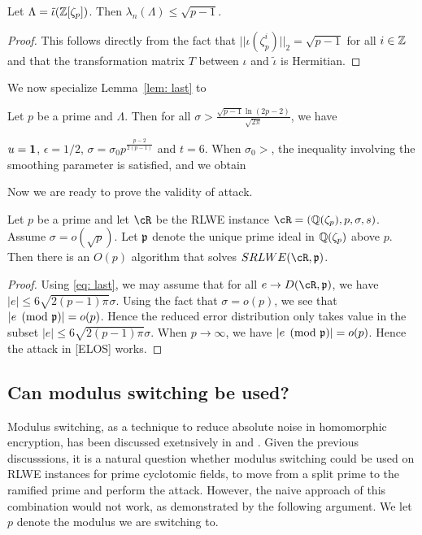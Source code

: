 \documentclass{amsart}
\begin{document}
\begin{Lemma}
Let $\Lambda = \tilde{\iota}(\mathbb{Z}[\zeta_p])$. Then $\lambda_n(\Lambda) \leq \sqrt{p-1}$.
\end{Lemma}

\begin{proof}
This follows directly from the fact that $||\iota(\zeta_p^i)||_2 = \sqrt{p-1}$ for all $i \in \mathbb{Z}$ and that the transformation matrix $T$ between $\iota$ and $\tilde{\iota}$ is Hermitian.
\end{proof}


We now specialize Lemma~\ref{lem: last} to

\begin{Prop}
Let $p$ be a prime and $\Lambda$. Then for all $\sigma > \frac{\sqrt{p-1} \ln(2p-2)}{\sqrt{2 \pi}}$, we have
\end{Prop}
$u = {\bf 1}$, $\epsilon = 1/2$, $\sigma = \sigma_0 p^{\frac{p-2}{2(p-1)}}$ and $t = 6$. When $\sigma_0 > $, the inequality involving the smoothing parameter is satisfied, and we obtain

Now we are ready to prove the validity of attack.
\begin{theorem}
Let $p$ be a prime and let $\cR$ be the RLWE instance $\cR = (\bQ(\zeta_p), p, \sigma,s)$.
Assume $\sigma = o(\sqrt{p})$. Let $\mathfrak{p}$ denote the unique prime ideal in $\mathbb{Q}(\zeta_p)$ above $p$. Then there is an $O(p)$ algorithm that solves $SRLWE(\cR,\fp)$.
\end{theorem}

\begin{proof}
Using \ref{eq: last}, we may assume that for all $e \to D(\cR,\fp)$, we have $|e|\leq 6\sqrt{2(p-1)\pi} \sigma$. Using the fact that $\sigma = o(p)$, we see that $|e \pmod{\mathfrak{p}}| = o(p)$. Hence the reduced error distribution only takes value in the subset
$|e|\leq 6\sqrt{2(p-1)\pi} \sigma$. When $p \to \infty$, we have $|e \pmod {\mathfrak{p}}| = o(p)$.  Hence the attack in [ELOS] works.
\end{proof}

\subsection{Can modulus switching be used?}
Modulus switching, as a technique to reduce absolute noise
in homomorphic encryption, has been discussed exetnsively in  \cite{brakerski2012leveled} and \cite{langlois2014worst}.
Given the previous discusssions, it is a natural question whether modulus switching
could be used on RLWE instances for prime cyclotomic fields, to move from a split prime to the ramified prime and perform the attack. However, the naive approach of this combination would not work, as demonstrated by the following argument.
We let $p$ denote the modulus we are switching to.
\end{document}
